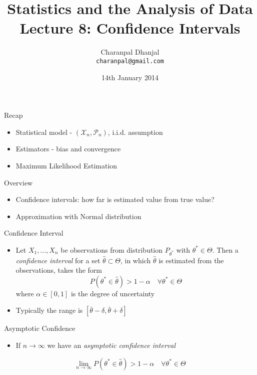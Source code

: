 \documentclass{beamer}
\title{Statistics and the Analysis of Data\\ Lecture 8: Confidence Intervals}
\author{Charanpal Dhanjal \\ \texttt{charanpal@gmail.com}}
\institute{\'{E}cole des Ponts}
\date{14th January 2014}
\begin{document}
\frame{\titlepage}

\begin{frame}{Recap}  
\begin{itemize} 
 \item Statistical model - $(\mathcal{X}_n, \mathcal{P}_n)$, i.i.d. assumption 
 \item Estimators - bias and convergence 
 \item Maximum Likelihood Estimation 
\end{itemize} 
\end{frame}

\begin{frame}{Overview}
\begin{itemize} 
 \item Confidence intervals: how far is estimated value from true value? 
\item Approximation with Normal distribution 
\end{itemize}
\end{frame}

\begin{frame}{Confidence Interval} 
\begin{itemize} 
 \item Let $X_1, \ldots, X_n$ be observations from distribution $P_{\theta^*}$ with $\theta^* \in \Theta$. Then a \emph{confidence interval} for a set  $\hat{\theta} \subset \Theta$, in which $\hat{\theta}$ is estimated from the observations, takes the form  
\begin{displaymath} 
 P(\theta^* \in \hat{\theta}) > 1 - \alpha \quad \forall \theta^* \in \Theta 
\end{displaymath}
 where $\alpha \in [0, 1]$ is the degree of uncertainty 
\item Typically the range is $[\bar{\theta} - \delta, \bar{\theta} + \delta]$   
\end{itemize}
\end{frame}

\begin{frame}{Asymptotic Confidence}  
\begin{itemize} 
 \item If $n \rightarrow \infty$ we have an \emph{asymptotic confidence interval} 
\end{itemize}
 \begin{displaymath} 
 \lim_{n \rightarrow \infty} P(\theta^* \in \hat{\theta}) > 1 - \alpha \quad \forall \theta^* \in \Theta 
\end{displaymath}
\end{frame}
\end{document}

